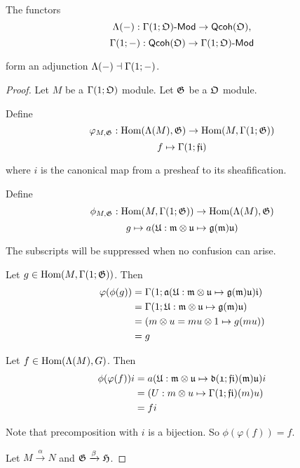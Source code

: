 



\begin{lemma}
The functors 
\[\Lambda({-}): \Gamma( 1 ; \mathfrak{O} )\text{-}{\ensuremath{\mathsf{Mod}}} \rightarrow {\ensuremath{\mathsf{Qcoh}}}(\mathfrak{O}),\]
\[\Gamma( 1 ; \mathfrak{{-}} ): {\mathsf{Qcoh}}(\mathfrak{O}) \rightarrow \Gamma( 1 ; \mathfrak{O} )\text{-}{\ensuremath{\mathsf{Mod}}}\]

form an adjunction ${\Lambda({-})} \dashv {\Gamma( 1; \ensuremath{\mathfrak{{-}}} )}$.
\end{lemma}

\begin{proof}
Let $M$ be a $\Gamma( 1 ; \mathfrak{O} )$ module.
Let $\mathfrak{G}$ be a $\mathfrak{O}$ module.

Define 
\[\varphi_{M,\mathfrak{G}}: \mbox{Hom}(\Lambda(M),\mathfrak{G}) \rightarrow \mbox{Hom}(M,\Gamma( 1 ; \mathfrak{G} ))\]
\[ f \mapsto \Gamma( 1 ; \mathfrak{fi} )\]

where $i$ is the canonical map from a presheaf to its sheafification.

Define 
\[\phi_{M,\mathfrak{G}}: \mbox{Hom}(M,\Gamma( 1 ; \mathfrak{G} )) \rightarrow \mbox{Hom}(\Lambda(M),\mathfrak{G})\]
\[ g \mapsto a(\mathfrak{U: m\otimes u \mapsto g(m)u})\]

The subscripts will be suppressed when no confusion can arise.

Let $g\in \mbox{Hom}(M,\Gamma( 1 ; \mathfrak{G} ))$. 
Then 
\begin{align*}
\varphi(\phi(g)) &= \Gamma( 1 ; \mathfrak{a(\mathfrak{U: m\otimes u \mapsto g(m)u})i} ) \\
&= \Gamma( 1 ; \mathfrak{U: m\otimes u \mapsto g(m)u} ) \\
&= (m \otimes u = mu \otimes 1 \mapsto g(mu)) \\
&= g
\end{align*}

Let $f\in \mbox{Hom}(\Lambda(M),G)$. 
Then 
\begin{align*}
\phi(\varphi(f))i &= a(\mathfrak{U: m\otimes u \mapsto \Gamma( 1 ; \mathfrak{fi} )(m)u})i \\
&= (U: m\otimes u \mapsto \Gamma( 1 ; \mathfrak{fi} )(m)u) \\
&= fi
\end{align*}

Note that precomposition with $i$ is a bijection. So $\phi(\varphi(f)) = f$.


Let $M\xrightarrow{\alpha} N$ and $\mathfrak{G}\xrightarrow{\beta} \mathfrak{H}$.



\end{proof}

